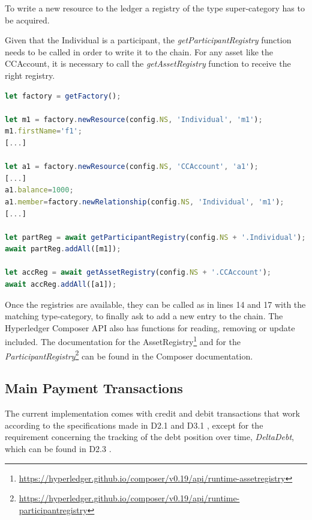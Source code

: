 To write a new resource to the ledger a registry of the type super-category has to be acquired.

Given that the Individual is a participant, the \textit{getParticipantRegistry} function needs to be called in order to write it to the chain. For any asset like the CCAccount, it is necessary to call the \textit{getAssetRegistry} function to receive the right registry.

\begin{center}
\begin{minipage}{0.8\textwidth}
\small
\begin{lstlisting}[language=javascript,firstnumber=1,caption={\bf\small Chaincode adding a new resource in \textit{initBlockchain} function}, captionpos=b,label=lst:initBlock]
let factory = getFactory();

let m1 = factory.newResource(config.NS, 'Individual', 'm1');
m1.firstName='f1';
[...]

let a1 = factory.newResource(config.NS, 'CCAccount', 'a1');
[...]
a1.balance=1000;
a1.member=factory.newRelationship(config.NS, 'Individual', 'm1');
[...]

let partReg = await getParticipantRegistry(config.NS + '.Individual');
await partReg.addAll([m1]);

let accReg = await getAssetRegistry(config.NS + '.CCAccount');
await accReg.addAll([a1]);
\end{lstlisting}
\end{minipage}
\end{center}

Once the registries are available, they can be called as in lines 14 and 17 with the matching type-category, to finally ask to add a new entry to the chain. The Hyperledger Composer API also has  functions for reading, removing or update included. The documentation for the AssetRegistry\footnote{\url{https://hyperledger.github.io/composer/v0.19/api/runtime-assetregistry}} and for the \textit{ParticipantRegistry}\footnote{\url{https://hyperledger.github.io/composer/v0.19/api/runtime-participantregistry}} can be found in the Composer documentation.

\subsection{Main Payment Transactions}
\label{subsec:main-payment-transactions}
The current implementation comes with credit and debit transactions that work according to the specifications made in D2.1 \cite{INTERLACE_D21} and D3.1 \cite{INTERLACE_D31}, except for the requirement concerning the tracking of the debt position over time, \textit{DeltaDebt}, which can be found in D2.3 \cite{INTERLACE_D23}.

